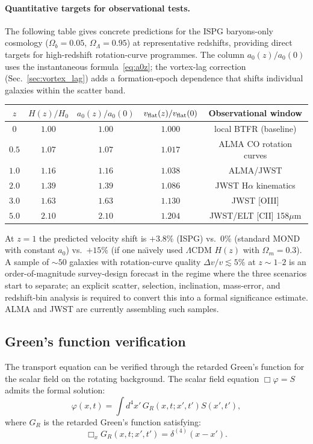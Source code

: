 \documentclass[11pt]{article}
\begin{document}
\paragraph{Quantitative targets for observational tests.}
The following table gives concrete predictions for the ISPG
baryons-only cosmology ($\Omega_b=0.05$, $\Omega_\Lambda=0.95$)
at representative redshifts, providing direct targets for
high-redshift rotation-curve programmes.  The column $a_0(z)/a_0(0)$
uses the instantaneous formula~\eqref{eq:a0z}; the vortex-lag
correction (Sec.~\ref{sec:vortex_lag}) adds a formation-epoch
dependence that shifts individual galaxies within the scatter band.
\begin{center}
\begin{tabular}{@{}ccccc@{}}
\toprule
$z$ & $H(z)/H_0$ & $a_0(z)/a_0(0)$ &
  $v_{\rm flat}(z)/v_{\rm flat}(0)$ &
  \textbf{Observational window} \\
\midrule
$0$   & $1.00$ & $1.00$ & $1.000$ & local BTFR (baseline) \\
$0.5$ & $1.07$ & $1.07$ & $1.017$ & ALMA CO rotation curves \\
$1.0$ & $1.16$ & $1.16$ & $1.038$ & ALMA/JWST \\
$2.0$ & $1.39$ & $1.39$ & $1.086$ & JWST H$\alpha$ kinematics \\
$3.0$ & $1.63$ & $1.63$ & $1.130$ & JWST [OIII] \\
$5.0$ & $2.10$ & $2.10$ & $1.204$ & JWST/ELT [CII] 158$\mu$m \\
\bottomrule
\end{tabular}
\end{center}
\noindent At $z=1$ the predicted velocity shift is $+3.8\%$
(ISPG) vs.\ $0\%$ (standard MOND with constant $a_0$) vs.\
$+15\%$ (if one na\"{\i}vely used $\Lambda$CDM $H(z)$
with $\Omega_m=0.3$).  A sample of $\sim\!50$ galaxies with
rotation-curve quality $\Delta v/v\lesssim5\%$ at $z\sim1$--$2$
is an order-of-magnitude survey-design forecast in the regime where
the three scenarios start to separate; an explicit scatter,
selection, inclination, mass-error, and redshift-bin analysis is
required to convert this into a formal significance estimate.
ALMA and JWST are currently assembling such samples.

\subsection{Green's function verification}

The transport equation can be verified through the retarded Green's function for the scalar field on the rotating background. The scalar field equation $\Box\varphi = S$ admits the formal solution:
\begin{equation}
\varphi(x,t) = \int d^4x'\, G_R(x,t; x',t') S(x',t'),
\label{eq:greens_solution}
\end{equation}
where $G_R$ is the retarded Green's function satisfying:
\begin{equation}
\Box_{x} G_R(x,t; x',t') = \delta^{(4)}(x-x').
\label{eq:greens_equation}
\end{equation}
\end{document}
